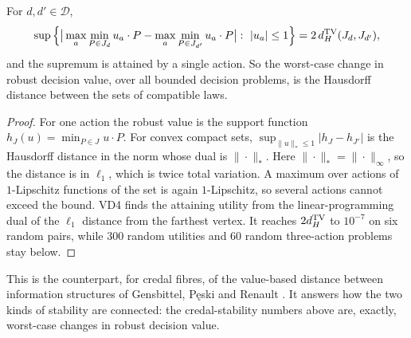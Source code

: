 \documentclass[11pt]{article}
\theoremstyle{definition}\newtheorem{definition}[theorem]{Definition}\newtheorem{remark}[theorem]{Remark}\newtheorem{example}[theorem]{Example}\newtheorem{problem}[theorem]{Open problem}\crefname{problem}{Problem}{Problems}
\newcommand{\Peski}{P{\fontencoding{T1}\selectfont\k{e}}ski}
\begin{document}
\begin{proposition}\label{prop:valuedist}
For $d,d'\in\mathcal D$,
\[\sup\Big\{\big|\max_a\min_{P\in J_d}u_a\cdot P-\max_a\min_{P\in J_{d'}}u_a\cdot P\big|:\ |u_a|\le1\Big\}=2\,d_H^{\rm TV}(J_d,J_{d'}),\]
and the supremum is attained by a single action. So the worst-case change in robust decision value, over all bounded decision problems, is the Hausdorff distance between the sets of compatible laws.
\end{proposition}

\begin{proof}
For one action the robust value is the support function $h_J(u)=\min_{P\in J}u\cdot P$. For convex compact sets, $\sup_{\|u\|_*\le1}|h_J-h_{J'}|$ is the Hausdorff distance in the norm whose dual is $\|\cdot\|_*$. Here $\|\cdot\|_*=\|\cdot\|_\infty$, so the distance is in $\ell_1$, which is twice total variation. A maximum over actions of $1$-Lipschitz functions of the set is again $1$-Lipschitz, so several actions cannot exceed the bound. VD4 finds the attaining utility from the linear-programming dual of the $\ell_1$ distance from the farthest vertex. It reaches $2d_H^{\rm TV}$ to $10^{-7}$ on six random pairs, while $300$ random utilities and $60$ random three-action problems stay below.
\end{proof}

This is the counterpart, for credal fibres, of the value-based distance between information structures of Gensbittel, \Peski{} and Renault \cite{GensbittelPeskiRenault2022}. It answers how the two kinds of stability are connected: the credal-stability numbers above are, exactly, worst-case changes in robust decision value.
\end{document}
